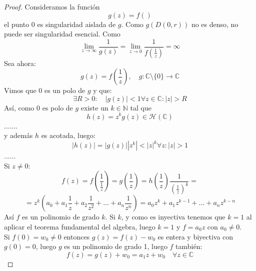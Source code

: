 \begin{proof}
    Consideramos la función
    \[
        g(z) = f()
    \]
    el punto $0$ es singularidad aislada de $g$. Como $g(D(0,r))$ no es denso, no puede ser singularidad esencial. Como
    \[
        \lim_{z \to \infty} \frac{1}{g(z)} = \lim_{z \to 0} \frac{1}{f(\frac{1}{z})} = \infty
    \]
    Sea ahora:
    \[
        g(z) = f\left(\frac{1}{z}\right), \quad g: \mathbb{C} \setminus \{0\} \to \mathbb{C}
    \]
    Vimos que 0 es un polo de $g$ y que:
    \[
    \exists R > 0: \quad |g(z)| < 1 \forall z \in \mathbb{C}: |z| > R
    \]
    Así, como 0 es polo de $g$ existe un $k \in \mathbb{N}$ tal que
    \[
        h(z) = z^k g(z) \in \mathcal{H}(\mathbb{C})
    \]
    .......\\
    y además $h$ es acotada, luego:
    \[
    |h(z)| = |g(z)||z^k| < |z|^k \forall z: |z| > 1
    \]
    ......\\
    Si $z \neq 0$:
    \[
    f(z) =
    f (\frac{1}{\frac{1}{z}}) =
    g(\frac{1}{z}) =
    h(\frac{1}{z}) \frac{1}{(\frac{1}{z})^k} =
    \]
    \[
    = z^k (a_0 + a_1 \frac{1}{z} + a_2 \frac{1}{z^2} + \ldots + a_n \frac{1}{z^n}) =
    a_0 z^k + a_1 z^{k-1} + \ldots + a_n z^{k-n}
    \]
    Así $f$ es un polinomio de grado $k$. Si $k$, y como es inyectiva tenemos que $k=1$ al aplicar el teorema fundamental del algebra, luego $k=1$ y $f=a_0z$ con $a_0 \neq 0$.\\
    Si $f(0) = w_0 \neq 0$ entonces $g(z) = f(z) - w_0$ es entera y biyectiva con $g(0) = 0$, luego $g$ es un polinomio de grado 1, luego $f$ también:
    \[
    f(z) =
    g(z) + w_0 =
    a_1 z + w_0 \quad \forall z \in \mathbb{C}
    \]
\end{proof}